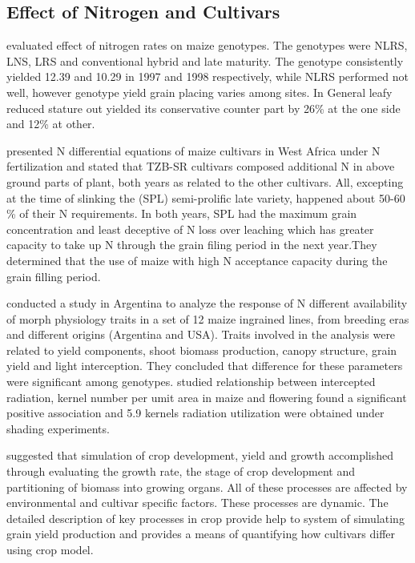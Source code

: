 \subsection{Effect of Nitrogen and Cultivars} 
 \citet{Costa2002} evaluated effect of nitrogen rates on maize genotypes. The genotypes were NLRS, LNS, LRS and conventional hybrid and late maturity. The genotype consistently yielded 12.39 and 10.29 in 1997 and 1998 respectively, while NLRS performed not well, however genotype yield grain placing varies among sites. In General leafy reduced stature out yielded its conservative counter part by 26\% at the one side and 12\% at other.     

  \citet{Oikeh2003} presented N differential equations of maize cultivars in West Africa under N fertilization and stated that TZB-SR cultivars composed additional N in above ground parts of plant, both years as related to the other cultivars. All, excepting at the time of slinking the (SPL) semi-prolific late variety, happened about 50-60 \% of their N requirements. In both years, SPL had the maximum grain concentration and least deceptive of N loss over leaching which has greater capacity to take up N through the grain filing period in the next year.They determined that the use of maize with high N acceptance capacity during the grain filling period.

 \citet{DAndrea2006} conducted a study in Argentina to analyze the response of N different availability of morph physiology traits in a set of 12 maize ingrained lines, from  breeding eras and different origins (Argentina and USA). Traits involved in the analysis were related to yield components, shoot biomass production, canopy structure, grain yield and light interception. They concluded that difference for these parameters were significant among genotypes. \citet{Andrade1993} studied relationship between intercepted radiation, kernel number per umit area in maize and flowering found a significant positive association and 5.9 kernels radiation utilization were obtained under shading experiments.

 \citet{Kiniry2001} suggested that simulation of crop development, yield and growth accomplished through evaluating the growth rate, the stage of crop development and partitioning of biomass into growing organs. All of these processes are affected by environmental and cultivar specific factors. These processes are dynamic. The detailed description of key processes in crop provide help to system of simulating grain yield production and provides a means of quantifying how cultivars differ using crop model.     


